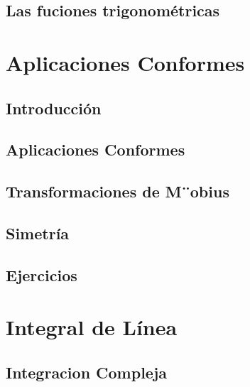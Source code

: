 \documentclass[]{book}
\theoremstyle{definition}
\theoremstyle{definition}
\theoremstyle{definition}
\theoremstyle{remark}
\begin{document}
\hypertarget{las-fuciones-trigonomuxe9tricas}{%
\section{Las fuciones trigonométricas}\label{las-fuciones-trigonomuxe9tricas}}

\hypertarget{aplicaciones-conformes}{%
\chapter{Aplicaciones Conformes}\label{aplicaciones-conformes}}

\hypertarget{introducciuxf3n}{%
\section{Introducción}\label{introducciuxf3n}}

\hypertarget{aplicaciones-conformes-1}{%
\section{Aplicaciones Conformes}\label{aplicaciones-conformes-1}}

\hypertarget{transformaciones-de-mobius}{%
\section{Transformaciones de M¨obius}\label{transformaciones-de-mobius}}

\hypertarget{simetruxeda}{%
\section{Simetría}\label{simetruxeda}}

\hypertarget{ejercicios-2}{%
\section{Ejercicios}\label{ejercicios-2}}

\hypertarget{integral-de-luxednea}{%
\chapter{Integral de Línea}\label{integral-de-luxednea}}

\hypertarget{integracion-compleja}{%
\section{Integracion Compleja}\label{integracion-compleja}}
\end{document}

